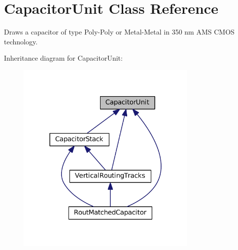 \hypertarget{classpython_1_1capacitorunit_1_1CapacitorUnit}{}\section{Capacitor\+Unit Class Reference}
\label{classpython_1_1capacitorunit_1_1CapacitorUnit}


Draws a capacitor of type Poly-\/\+Poly or Metal-\/\+Metal in 350 nm A\+MS C\+M\+OS technology.  




Inheritance diagram for Capacitor\+Unit\+:
\nopagebreak
\begin{figure}[H]
\begin{center}
\leavevmode
\includegraphics[width=249pt]{classpython_1_1capacitorunit_1_1CapacitorUnit__inherit__graph}
\end{center}
\end{figure}
